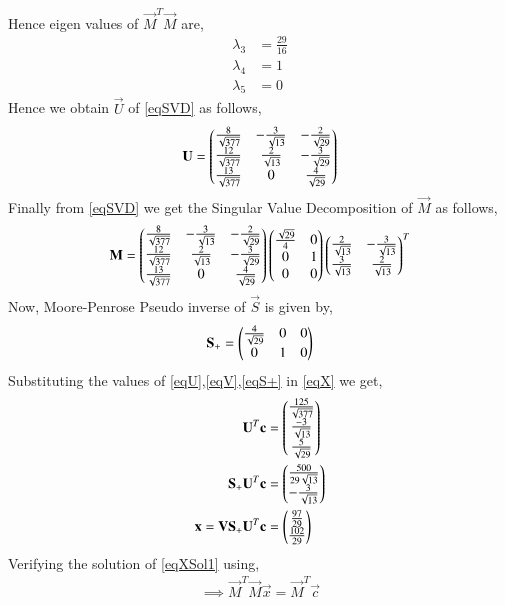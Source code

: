 \documentclass[journal,12pt,twocolumn]{IEEEtran}
\begin{document}
Hence eigen values of $\vec{M}^T\vec{M}$ are,
\begin{align}
\lambda_3 &=\frac{29}{16}\\
\lambda_4 &= 1\\
\lambda_5 &= 0
\end{align}
Hence we obtain $\vec{U}$ of \eqref{eqSVD} as follows,
\begin{align}
\mathbf{U}=\label{eqU}\begin{pmatrix}\frac{8}{\sqrt{377}}&-\frac{3}{\sqrt{13}}&-\frac{2}{\sqrt{29}}\\\frac{12}{\sqrt{377}}&\frac{2}{\sqrt{13}}&-\frac{3}{\sqrt{29}}\\\frac{13}{\sqrt{377}}&0&\frac{4}{\sqrt{29}}\end{pmatrix}
\end{align}
Finally from \eqref{eqSVD} we get the Singular Value Decomposition of $\vec{M}$ as follows,
\begin{align}
\mathbf{M} = \begin{pmatrix}\frac{8}{\sqrt{377}}&-\frac{3}{\sqrt{13}}&-\frac{2}{\sqrt{29}}\\\frac{12}{\sqrt{377}}&\frac{2}{\sqrt{13}}&-\frac{3}{\sqrt{29}}\\\frac{13}{\sqrt{377}}&0&\frac{4}{\sqrt{29}}\end{pmatrix}\begin{pmatrix}\frac{\sqrt{29}}{4}&0\\0&1\\0&0\end{pmatrix}\begin{pmatrix}\frac{2}{\sqrt{13}}&-\frac{3}{\sqrt{13}}\\ \frac{3}{\sqrt{13}}&\frac{2}{\sqrt{13}}\end{pmatrix}^T
\end{align}
Now, Moore-Penrose Pseudo inverse of $\vec{S}$ is given by,
\begin{align}
\mathbf{S_+} = \begin{pmatrix}\frac{4}{\sqrt{29}}&0&0\\0&1&0\end{pmatrix}\label{eqS+}
\end{align}
Substituting the values of \eqref{eqU},\eqref{eqV},\eqref{eqS+} in \eqref{eqX}  we get,
\begin{align}
\mathbf{U}^T\mathbf{c}&=\begin{pmatrix}\frac{125}{\sqrt{377}}\\\frac{-3}{\sqrt{13}}\\\frac{5}{\sqrt{29}}\end{pmatrix}\\
\mathbf{S_+}\mathbf{U}^T\mathbf{c}&=\begin{pmatrix}\frac{500}{29\sqrt{13}}\\-\frac{3}{\sqrt{13}}\end{pmatrix}\\
\mathbf{x} = \mathbf{V}\mathbf{S_+}\mathbf{U}^T\mathbf{c} &= \begin{pmatrix}\frac{97}{29}\\\frac{102}{29}\end{pmatrix}\label{eqXSol1}
\end{align}
Verifying the solution of \eqref{eqXSol1} using,
\begin{align}
\implies \vec{M}^T\vec{M}\vec{x} = \vec{M}^T\vec{c}\label{eqVerify}
\end{align}
\end{document}
